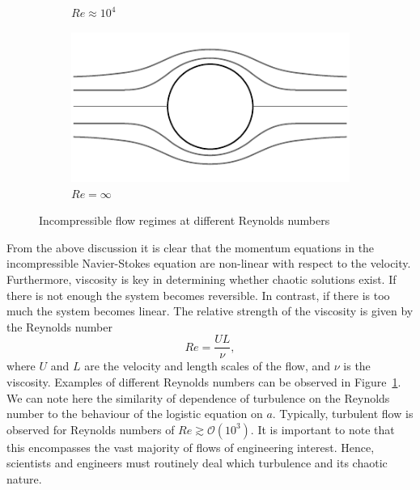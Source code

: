 \begin{figure}[tbp]
\begin{subfigure}[b]{0.40\textwidth}
		\caption{$Re\approx10^4$}
	\end{subfigure}
	\begin{subfigure}[b]{0.40\textwidth}
		\includegraphics[width=\linewidth]{Pictures/cylinder_1}
		\caption{$Re=\infty$}
	\end{subfigure}
	\caption{Incompressible flow regimes at different Reynolds numbers}
	\label{fig:flow_regimes}
\end{figure}
From the above discussion it is clear that the momentum equations in the incompressible Navier-Stokes equation are non-linear with respect to the velocity. Furthermore, viscosity is key in determining whether chaotic solutions exist. If there is not enough the system becomes reversible. In contrast, if there is too much the system becomes linear. The relative strength of the viscosity is given by the Reynolds number
\begin{equation}
	Re = \frac{UL}{\nu},
\end{equation}
where $U$ and $L$ are the velocity and length scales of the flow, and $\nu$ is the viscosity. Examples of different Reynolds numbers can be observed in Figure~\ref{fig:flow_regimes}. We can note here the similarity of dependence of turbulence on the Reynolds number to the behaviour of the logistic equation on $a$. Typically, turbulent flow is observed for Reynolds numbers of $Re \gtrsim \mathcal{O}(10^3)$. It is important to note that this encompasses the vast majority of flows of engineering interest. Hence, scientists and engineers must routinely deal which turbulence and its chaotic nature.



